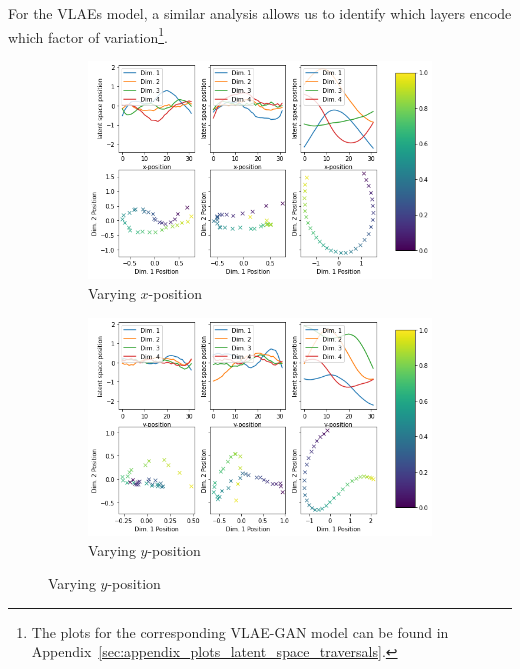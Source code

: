 For the \acp{VLAE} model, a similar analysis allows us to identify which layers encode which factor of variation\footnote{The plots for the corresponding \ac{VLAE}-\ac{GAN} model can be found in Appendix~\ref{sec:appendix_plots_latent_space_traversals}.}.
\begin{figure}
    \centering
    \begin{subfigure}{.48\textwidth}
        \centering
        \includegraphics[width=\textwidth]{images/latent_space_traversals/vlae_dsprites_left_latent_space_values.png}
        \caption{Varying $x$-position}
        \label{subfig:vlae_dsprites_latent_space_values_x}
    \end{subfigure}
    \hfill
    \begin{subfigure}{.48\textwidth}
        \centering
        \includegraphics[width=\textwidth]{images/latent_space_traversals/vlae_dsprites_bottom_latent_space_values.png}
        \caption{Varying $y$-position}
        \label{subfig:vlae_dsprites_latent_space_values_y}

\end{subfigure}
\end{figure}
